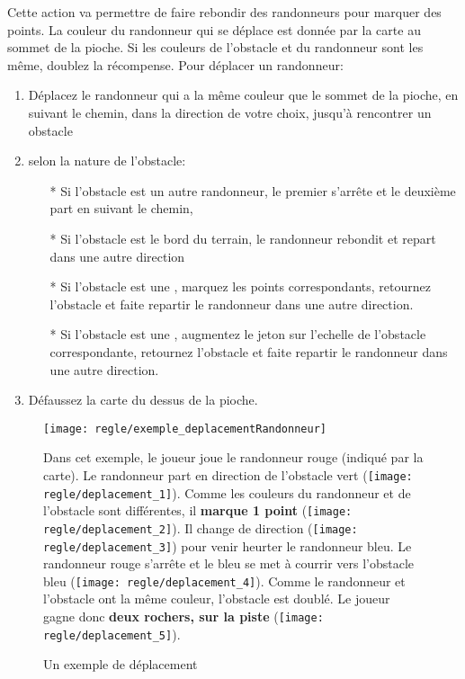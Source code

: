 Cette action va permettre de faire rebondir des randonneurs pour marquer des points. La couleur du randonneur qui se déplace est donnée par la carte au sommet de la pioche. Si les couleurs de l'obstacle et du randonneur sont les même, doublez la récompense. Pour déplacer un randonneur:
\begin{enumerate}
\item Déplacez le randonneur qui a la même couleur que le sommet de la pioche, en suivant le chemin, dans la direction de votre choix, jusqu'à rencontrer un obstacle
\item selon la nature de l'obstacle:
\begin{itemize}
\item[*] Si l'obstacle est un autre randonneur, le premier s'arrête et le deuxième part en suivant le chemin,
\item[*] Si l'obstacle est le bord du terrain, le randonneur rebondit et repart dans une autre direction
\item[*] Si l'obstacle est une \faceValeur, marquez les points correspondants, retournez l'obstacle et faite repartir le randonneur dans une autre direction.
\item[*] Si l'obstacle est une \faceObstacle, augmentez le jeton sur l'echelle de l'obstacle correspondante, retournez l'obstacle et faite repartir le randonneur dans une autre direction.
\end{itemize}
\item Défaussez la carte du dessus de la pioche.
\end{enumerate}

\begin{figure}[h]
\begin{tcolorbox}[colback=white,colframe=OliveGreen!75!black,title=Exemple]
{
	\texttt{[image: regle/exemple\_deplacementRandonneur]}
    \caption{Un exemple de déplacement}

Dans cet exemple, le joueur \foudre joue le randonneur rouge (indiqué par la carte). Le randonneur part en direction de l'obstacle vert (\texttt{[image: regle/deplacement\_1]}). Comme les couleurs du randonneur et de l'obstacle sont différentes, il \textbf{marque 1 point} (\texttt{[image: regle/deplacement\_2]}). Il change de direction (\texttt{[image: regle/deplacement\_3]}) pour venir heurter le randonneur bleu. Le randonneur rouge s'arrête et le bleu se met à courrir vers l'obstacle bleu (\texttt{[image: regle/deplacement\_4]}). Comme le randonneur et l'obstacle ont la même couleur, l'obstacle est doublé. Le joueur gagne donc \textbf{deux rochers, sur la piste \rocher} (\texttt{[image: regle/deplacement\_5]}).
    
}
\end{tcolorbox}
\end{figure}
\FloatBarrier


